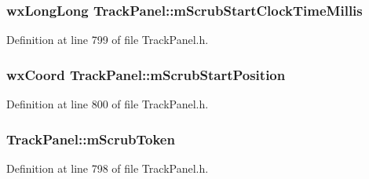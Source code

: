 \subsubsection[{\texorpdfstring{m\+Scrub\+Start\+Clock\+Time\+Millis}{mScrubStartClockTimeMillis}}]{\setlength{\rightskip}{0pt plus 5cm}wx\+Long\+Long Track\+Panel\+::m\+Scrub\+Start\+Clock\+Time\+Millis\hspace{0.3cm}{\ttfamily [protected]}}\hypertarget{class_track_panel_ae463294b215dacd0cb93f54bc360ecde}{}\label{class_track_panel_ae463294b215dacd0cb93f54bc360ecde}


Definition at line 799 of file Track\+Panel.\+h.

\subsubsection[{\texorpdfstring{m\+Scrub\+Start\+Position}{mScrubStartPosition}}]{\setlength{\rightskip}{0pt plus 5cm}wx\+Coord Track\+Panel\+::m\+Scrub\+Start\+Position\hspace{0.3cm}{\ttfamily [protected]}}\hypertarget{class_track_panel_a42bcca5177786a6bef89d3314337fa6e}{}\label{class_track_panel_a42bcca5177786a6bef89d3314337fa6e}


Definition at line 800 of file Track\+Panel.\+h.

\subsubsection[{\texorpdfstring{m\+Scrub\+Token}{mScrubToken}}]{ Track\+Panel\+::m\+Scrub\+Token\hspace{0.3cm}{\ttfamily [protected]}}\hypertarget{class_track_panel_af56e383d9608b0ee7500fbe10c5d8369}{}\label{class_track_panel_af56e383d9608b0ee7500fbe10c5d8369}


Definition at line 798 of file Track\+Panel.\+h.

